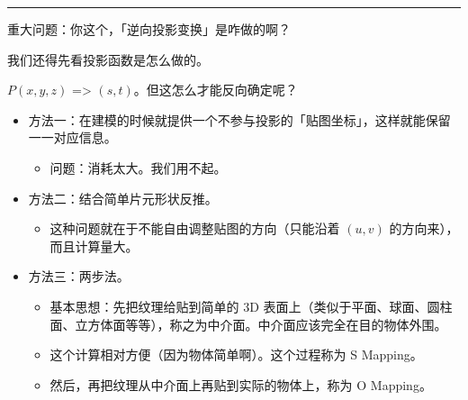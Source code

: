 \documentclass[
]{article}
\begin{document}
\begin{center}\rule{0.5\linewidth}{\linethickness}\end{center}

重大问题：你这个，「逆向投影变换」是咋做的啊？

我们还得先看投影函数是怎么做的。

\(P(x, y, z)\) =\textgreater{} \((s, t)\)。但这怎么才能反向确定呢？

\begin{itemize}
\item
  方法一：在建模的时候就提供一个不参与投影的「贴图坐标」，这样就能保留一一对应信息。

  \begin{itemize}
  \item
    问题：消耗太大。我们用不起。
  \end{itemize}
\item
  方法二：结合简单片元形状反推。

  \begin{itemize}
  \item
    这种问题就在于不能自由调整贴图的方向（只能沿着 \((u, v)\)
    的方向来），而且计算量大。
  \end{itemize}
\item
  方法三：两步法。

  \begin{itemize}
  \item
    基本思想：先把纹理给贴到简单的 3D
    表面上（类似于平面、球面、圆柱面、立方体面等等），称之为中介面。中介面应该完全在目的物体外围。
  \item
    这个计算相对方便（因为物体简单啊）。这个过程称为 S Mapping。
  \item
    然后，再把纹理从中介面上再贴到实际的物体上，称为 O Mapping。
  \end{itemize}
\end{itemize}
\end{document}
